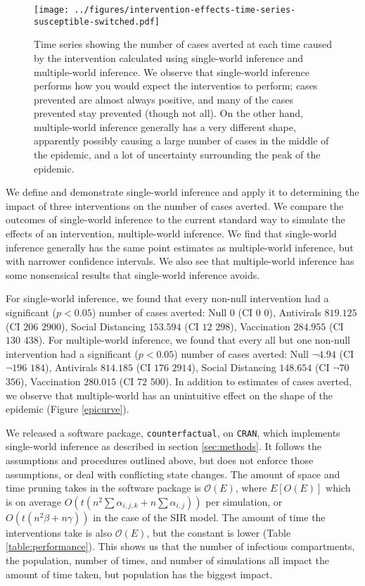 \documentclass[PTRSB]{rsos}
\makeatletter
\def\checkGraphicsWidth{\ifdim\Gin@nat@width>\linewidth
	\tsGraphicsScaleX\linewidth\else\Gin@nat@width\fi}
\let\ts@includegraphics\includegraphics
\renewcommand{\includegraphics}[1]{\ts@includegraphics[width=\checkGraphicsWidth]{#1}}
\makeatother
\begin{document}
\begin{multicols}{2}
\begin{figure}
\centering
\texttt{[image: ../figures/intervention-effects-time-series-susceptible-switched.pdf]}
\caption{Time series showing the number of cases averted at each time caused by the intervention calculated using single-world inference and multiple-world inference.  We observe that single-world inference performs how you would expect the interventios to perform; cases prevented are almost always positive, and many of the cases prevented stay prevented (though not all). On the other hand, multiple-world inference generally has a very different shape, apparently possibly causing a large number of cases in the middle of the epidemic, and a lot of uncertainty surrounding the peak of the epidemic.}
\label{fig:epicurve}
\end{figure}

We define and demonstrate single-world inference and apply it to determining the impact of three interventions on the number of cases averted.
We compare the outcomes of single-world inference to the current standard way to simulate the effects of an intervention, multiple-world inference.
We find that single-world inference generally has the same point estimates as multiple-world inference, but with narrower confidence intervals.
We also see that multiple-world inference has some nonsensical results that single-world inference avoids.

For single-world inference, we found that every non-null intervention had a significant ($p<0.05$) number of cases averted: Null $ 0 $ (CI $ 0 $ \textemdash $ 0 $), Antivirals $ 819.125 $ (CI $ 206 $ \textemdash $ 2900 $), Social Distancing $ 153.594 $ (CI $ 12 $ \textemdash $ 298 $), Vaccination $ 284.955 $ (CI $ 130 $ \textemdash $ 438 $).
For multiple-world inference, we found that every all but one non-null intervention had a significant ($p<0.05$) number of cases averted: Null $ \neg4.94 $ (CI $ \neg196 $ \textemdash $ 184 $), Antivirals $ 814.185 $ (CI $ 176 $ \textemdash $ 2914 $), Social Distancing $ 148.654 $ (CI $ \neg70 $ \textemdash $ 356 $), Vaccination $ 280.015 $ (CI $ 72 $ \textemdash $ 500 $).
In addition to estimates of cases averted, we observe that multiple-world has an unintuitive effect on the shape of the epidemic (Figure \ref{epicurve}).

We released a software package, \texttt{counterfactual}, on \texttt{CRAN}, %
which implements single-world inference as described in section \ref{sec:methods}.
It follows the assumptions and procedures outlined above, but does not enforce those assumptions, or deal with conflicting state changes.
The amount of space and time pruning takes in the software package is $\mathcal O(E)$, where $E[O(E)]$ which is on average $O(t(n^2\sum \alpha_{i,j,k} + n \sum\alpha_{i,j}))$ per simulation, or $O(t(n^2\beta + n\gamma))$ in the case of the SIR model.
The amount of time the interventions take is also $\mathcal O(E)$, but the constant is lower (Table \ref{table:performance}).
This shows us that the number of infectious compartments, the population, number of times, and number of simulations all impact the amount of time taken, but population has the biggest impact.


\end{multicols}
\end{document}
